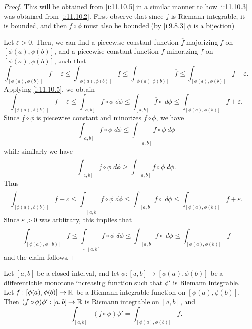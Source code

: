 \begin{proof}
  This will be obtained from \cref{i:11.10.5} in a similar manner to how \cref{i:11.10.3} was obtained from \cref{i:11.10.2}.
  First observe that since \(f\) is Riemann integrable, it is bounded, and then \(f \circ \phi\) must also be bounded (by \cref{i:9.8.3} \(\phi\) is a bijection).

  Let \(\varepsilon > 0\).
  Then, we can find a piecewise constant function \(\overline{f}\) majorizing \(f\) on \([\phi(a), \phi(b)]\), and a piecewise constant function \(\underline{f}\) minorizing \(f\) on \([\phi(a), \phi(b)]\), such that
  \[
    \int_{[\phi(a), \phi(b)]} f - \varepsilon \leq \int_{[\phi(a), \phi(b)]} \underline{f} \leq \int_{[\phi(a), \phi(b)]} \overline{f} \leq \int_{[\phi(a), \phi(b)]} f + \varepsilon.
  \]
  Applying \cref{i:11.10.5}, we obtain
  \[
    \int_{[\phi(a), \phi(b)]} f - \varepsilon \leq \int_{[a, b]} \underline{f} \circ \phi \; d \phi \leq \int_{[a, b]} \overline{f} \circ \; d \phi \leq \int_{[\phi(a), \phi(b)]} f + \varepsilon.
  \]
  Since \(\underline{f} \circ \phi\) is piecewise constant and minorizes \(f \circ \phi\), we have
  \[
    \int_{[a, b]} \underline{f} \circ \phi \; d \phi \leq \underline{\int}_{[a, b]} f \circ \phi \; d \phi
  \]
  while similarly we have
  \[
    \int_{[a, b]} \overline{f} \circ \phi \; d \phi \geq \overline{\int}_{[a, b]} f \circ \phi \; d \phi.
  \]
  Thus
  \[
    \int_{[\phi(a), \phi(b)]} f - \varepsilon \leq \underline{\int}_{[a, b]} f \circ \phi \; d \phi \leq \overline{\int}_{[a, b]} f \circ \; d \phi \leq \int_{[\phi(a), \phi(b)]} f + \varepsilon.
  \]
  Since \(\varepsilon > 0\) was arbitrary, this implies that
  \[
    \int_{[\phi(a), \phi(b)]} f \leq \underline{\int}_{[a, b]} f \circ \phi \; d \phi \leq \overline{\int}_{[a, b]} f \circ \; d \phi \leq \int_{[\phi(a), \phi(b)]} f
  \]
  and the claim follows.
\end{proof}

\begin{prop}\label{i:11.10.7}
  Let \([a, b]\) be a closed interval, and let \(\phi : [a, b] \to [\phi(a), \phi(b)]\) be a differentiable monotone increasing function such that \(\phi'\) is Riemann integrable.
  Let \(f : [\phi(a), \phi(b)] \to \mathbb{R}\) be a Riemann integrable function on \([\phi(a), \phi(b)]\).
  Then \((f \circ \phi) \phi' : [a, b] \to \mathbb{R}\) is Riemann integrable on \([a, b]\), and
  \[
    \int_{[a, b]} (f \circ \phi) \phi' = \int_{[\phi(a), \phi(b)]} f.
  \]
\end{prop}

